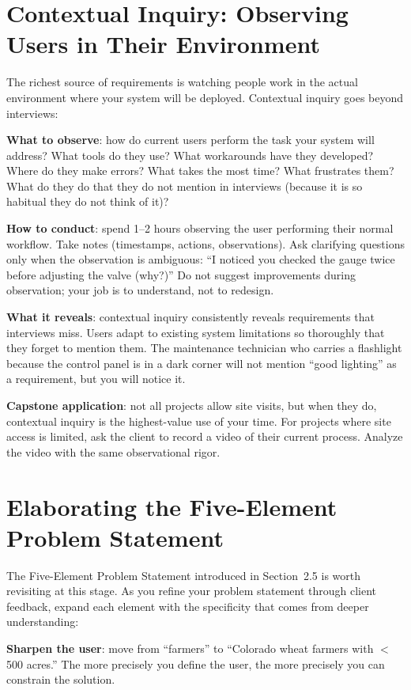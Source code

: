 \section{Contextual Inquiry: Observing Users in Their Environment}\label{sec:contextual-inquiry}
The richest source of requirements is watching people work in the actual environment where your system will be deployed. Contextual inquiry goes beyond interviews:

\textbf{What to observe}: how do current users perform the task your system will address? What tools do they use? What workarounds have they developed? Where do they make errors? What takes the most time? What frustrates them? What do they do that they do not mention in interviews (because it is so habitual they do not think of it)?

\textbf{How to conduct}: spend 1--2 hours observing the user performing their normal workflow. Take notes (timestamps, actions, observations). Ask clarifying questions only when the observation is ambiguous: ``I noticed you checked the gauge twice before adjusting the valve (why?)'' Do not suggest improvements during observation; your job is to understand, not to redesign.

\textbf{What it reveals}: contextual inquiry consistently reveals requirements that interviews miss. Users adapt to existing system limitations so thoroughly that they forget to mention them. The maintenance technician who carries a flashlight because the control panel is in a dark corner will not mention ``good lighting'' as a requirement, but you will notice it.

\textbf{Capstone application}: not all projects allow site visits, but when they do, contextual inquiry is the highest-value use of your time. For projects where site access is limited, ask the client to record a video of their current process. Analyze the video with the same observational rigor.



\section{Elaborating the Five-Element Problem Statement}
The Five-Element Problem Statement introduced in Section~2.5 is worth revisiting at this stage. As you refine your problem statement through client feedback, expand each element with the specificity that comes from deeper understanding:

\textbf{Sharpen the user}: move from ``farmers'' to ``Colorado wheat farmers with $<$500 acres.'' The more precisely you define the user, the more precisely you can constrain the solution.

